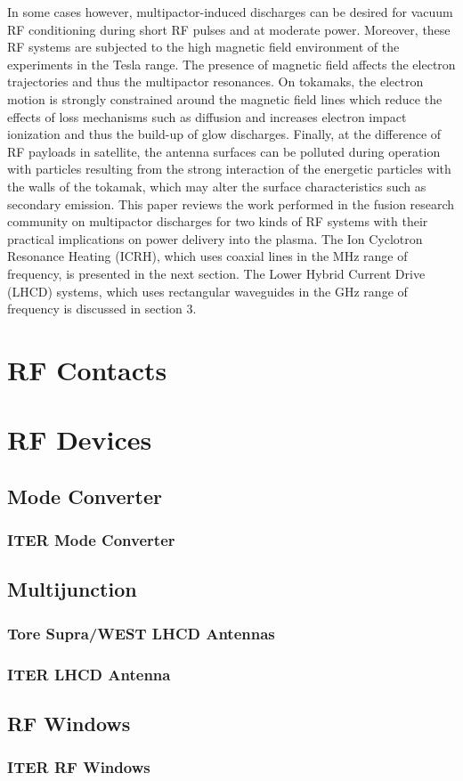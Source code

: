In some cases however, multipactor-induced discharges can be desired for vacuum RF conditioning during short RF pulses and at moderate power. Moreover, these RF systems are subjected to the high magnetic field environment of the experiments in the Tesla range. The presence of magnetic field affects the electron trajectories and thus the multipactor resonances. On tokamaks, the electron motion is strongly constrained around the magnetic field lines which reduce the effects of loss mechanisms such as diffusion and increases electron impact ionization and thus the build-up of glow discharges. Finally, at the difference of RF payloads in satellite, the antenna surfaces can be polluted during operation with particles resulting from the strong interaction of the energetic particles with the walls of the tokamak, which may alter the surface characteristics such as secondary emission. This paper reviews the work performed in the fusion research community on multipactor discharges for two kinds of RF systems with their practical implications on power delivery into the plasma. The Ion Cyclotron Resonance Heating (ICRH), which uses coaxial lines in the MHz range of frequency, is presented in the next section. The Lower Hybrid Current Drive (LHCD) systems, which uses rectangular waveguides in the GHz range of frequency is discussed in section 3. 




\section{RF Contacts}

\section{RF Devices}
\subsection{Mode Converter}
\subsubsection{ITER Mode Converter}

\subsection{Multijunction}

\subsubsection{Tore Supra/WEST LHCD Antennas}

\subsubsection{ITER LHCD Antenna}

\subsection{RF Windows}
\subsubsection{ITER RF Windows}

